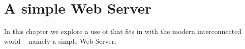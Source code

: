 \chapter{A simple Web Server}
\label{goweb}

In this chapter we explore a use of \go that fits in with the modern interconnected world -- namely a simple Web Server. 

